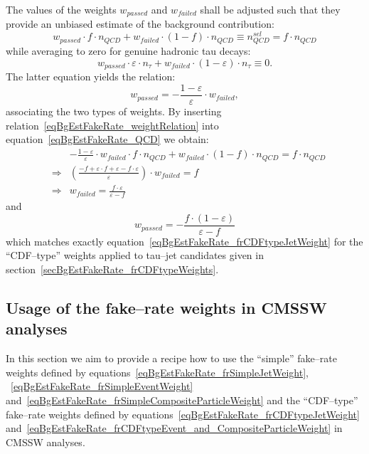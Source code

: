 The values of the weights $w_{passed}$ and $w_{failed}$ 
shall be adjusted such that they provide an unbiased estimate of the background contribution:
\begin{equation}
w_{passed} \cdot f \cdot n_{QCD} + w_{failed} \cdot \left( 1 - f \right) \cdot n_{QCD} \equiv n_{QCD}^{sel} = f \cdot n_{QCD}
\label{eqBgEstFakeRate_QCD}
\end{equation}
while averaging to zero for genuine hadronic tau decays:
\begin{equation*}
w_{passed} \cdot \varepsilon \cdot n_{\tau} + w_{failed} \cdot \left( 1 - \varepsilon \right) \cdot n_{\tau} \equiv 0.
\label{eqBgEstFakeRate_tau}
\end{equation*}
The latter equation yields the relation:
\begin{equation}
w_{passed} = -\frac{1 - \varepsilon}{\varepsilon} \cdot w_{failed},
\label{eqBgEstFakeRate_weightRelation}
\end{equation}
associating the two types of weights.
By inserting relation~\ref{eqBgEstFakeRate_weightRelation} into equation~\ref{eqBgEstFakeRate_QCD} we obtain:
\begin{eqnarray*}
& & -\frac{1 - \varepsilon}{\varepsilon} \cdot w_{failed} \cdot f \cdot n_{QCD} + w_{failed} \cdot \left( 1 - f \right) \cdot n_{QCD} 
 = f \cdot n_{QCD} \\
& \Rightarrow & \left( \frac{-f + \varepsilon \cdot f + \varepsilon - f \cdot \varepsilon}{\varepsilon} \right) \cdot w_{failed} = f \\
& \Rightarrow & w_{failed} = \frac{f \cdot \varepsilon}{\varepsilon - f} 
\end{eqnarray*}
and 
\begin{equation}
w_{passed} = -\frac{f \cdot \left( 1 - \varepsilon \right)}{\varepsilon - f}
\end{equation}
which matches exactly equation~\ref{eqBgEstFakeRate_frCDFtypeJetWeight} 
for the ``CDF--type'' weights applied to tau--jet candidates given in section~\ref{secBgEstFakeRate_frCDFtypeWeights}.

\subsection{Usage of the fake--rate weights in CMSSW analyses}

In this section we aim to provide a recipe how to use the ``simple'' fake--rate
weights defined by equations~\ref{eqBgEstFakeRate_frSimpleJetWeight},
~\ref{eqBgEstFakeRate_frSimpleEventWeight}
and~\ref{eqBgEstFakeRate_frSimpleCompositeParticleWeight} 
and the ``CDF--type'' fake--rate weights defined by 
equations~\ref{eqBgEstFakeRate_frCDFtypeJetWeight}
and~\ref{eqBgEstFakeRate_frCDFtypeEvent_and_CompositeParticleWeight} 
in CMSSW analyses.

